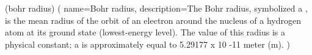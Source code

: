 \newglossaryentry(bohr radius)
(
     name=Bohr radius,
     description={The Bohr radius, symbolized a , is the mean radius of the orbit of an electron around the nucleus of a hydrogen atom at its ground state (lowest-energy level). The value of this radius is a physical constant; a is approximately equal to 5.29177 x 10 -11 meter (m).}
     )
